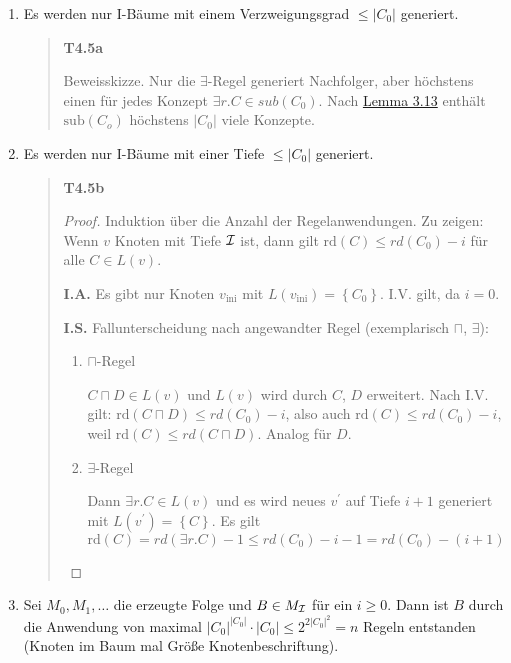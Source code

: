 \begin{enumerate}
\def\labelenumi{\arabic{enumi}.}
\item
  Es werden nur I-Bäume mit einem Verzweigungsgrad
  $\leq \left| C_{0} \right|$ generiert.

\begin{quote}
\textbf{T4.5a}

Beweisskizze. Nur die $\exists$-Regel generiert Nachfolger, aber
höchstens einen für jedes Konzept $\exists r.C \in sub(C_{0})$. Nach
\protect\hyperlink{lemma-3.13}{Lemma 3.13} enthält
$\text{sub}\left( C_{o} \right)$ höchstens $\left| C_{0} \right|$
viele Konzepte.
\end{quote}

\def\labelenumi{\arabic{enumi}.}
\item
  Es werden nur I-Bäume mit einer Tiefe $\leq \left| C_{0} \right|$
  generiert.

\begin{quote}
\textbf{T4.5b}
\begin{proof}

Induktion über die Anzahl der Regelanwendungen. Zu zeigen: Wenn $v$
Knoten mit Tiefe $\mathcal{I}$ ist, dann gilt
$\text{rd}\left( C \right) \leq rd\left( C_{0} \right) - i$ für alle
$C \in L\left( v \right)$.

\textbf{I.A.} Es gibt nur Knoten $v_{\text{ini}}$ mit
$L\left( v_{\text{ini}} \right) = \left\{ C_{0} \right\}$. I.V. gilt,
da $i = 0$.

\textbf{I.S.} Fallunterscheidung nach angewandter Regel (exemplarisch
$\sqcap$, $\exists$):

\begin{enumerate}
\def\labelenumi{\alph{enumi}.}
\item
  $\sqcap$-Regel

$C \sqcap D \in L(v)$ und $L(v)$ wird durch $C$, $D$ erweitert.
Nach I.V. gilt:
$\text{rd}\left( C \sqcap D \right) \leq rd\left( C_{0} \right) - i$,
also auch $\text{rd}\left( C \right) \leq rd\left( C_{0} \right) - i$,
weil $\text{rd}\left( C \right) \leq rd\left( C \sqcap D \right)$.
Analog für $D$.

\def\labelenumi{\alph{enumi}.}
\item
  $\exists$-Regel

Dann $\exists r.C \in L\left( v \right)$ und es wird neues $v^{'}$
auf Tiefe $i + 1$ generiert mit
$L\left( v^{'} \right) = \left\{ C \right\}$. Es gilt
$\text{rd}\left( C \right) = rd\left( \exists r.C \right) - 1 \leq rd\left( C_{0} \right) - i - 1 = rd\left( C_{0} \right) - (i + 1)$
 \end{enumerate}
\end{proof}
\end{quote}

\item
  Sei $M_{0},M_1,\ldots$ die erzeugte Folge und $B \in M_{\mathcal{I}}$ für
  ein $i \geq 0$. Dann ist $B$ durch die Anwendung von maximal
  $\left| C_{0} \right|^{\left| C_{0} \right|} \cdot \left| C_{0} \right| \leq 2^{2\left| C_{0} \right|^{2}} = n$ Regeln entstanden (Knoten im Baum mal Größe Knotenbeschriftung).

\end{enumerate}

